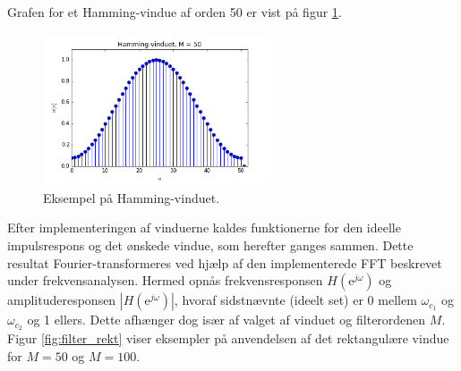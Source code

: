 Grafen for et Hamming-vindue af orden 50 er vist på figur \ref{fig:Hamming}.
\begin{figure}[H]
    \centering
    \includegraphics[width = 0.6\textwidth]{figures/Filter/Hamming_50.PNG}
    \caption{Eksempel på Hamming-vinduet.}
    \label{fig:Hamming}
\end{figure}

Efter implementeringen af vinduerne kaldes funktionerne for den ideelle impulsrespons og det ønskede vindue, som herefter ganges sammen. Dette resultat Fourier-transformeres ved hjælp af den implementerede FFT beskrevet under frekvensanalysen. Hermed opnås frekvensresponsen $H(\text{e}^{j\omega})$ og amplituderesponsen $|H(\text{e}^{j\omega})|$, hvoraf sidstnævnte (ideelt set) er 0 mellem $\omega_{c_1}$ og $\omega_{c_2}$ og 1 ellers. Dette afhænger dog især af valget af vinduet og filterordenen $M$. Figur \ref{fig:filter_rekt} viser eksempler på anvendelsen af det rektangulære vindue for $M = 50$ og $M = 100$.


